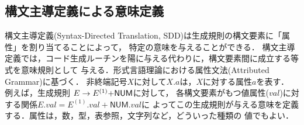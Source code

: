 \documentclass[dvipdfmx,a4j]{jbook}
\begin{document}



\subsection{構文主導定義による意味定義}

構文主導定義(Syntax-Directed Translation, SDD)は生成規則の構文要素に「属性」を割り当てることによって，
特定の意味を与えることができる．
構文主導定義では，コード生成ルーチンを陽に与える代わりに，構文要素間に成立する等式を意味規則として
与える．形式言語理論における属性文法(Attributed Grammar)に基づく．
非終端記号$X$に対して$X.a$は，$X$に対する属性$a$を表す．
例えば，生成規則 $E\rightarrow E^{(1)}{\tt +}\mathsf{NUM}$に対して，
各構文要素がもつ値属性($val$)に対する関係$E.val=E^{(1)}.val+\mathsf{NUM}.val$に
よってこの生成規則が与える意味を定義する．属性は，数，型，表参照，文字列など，どういった種類の
値でもよい．
\end{document}
